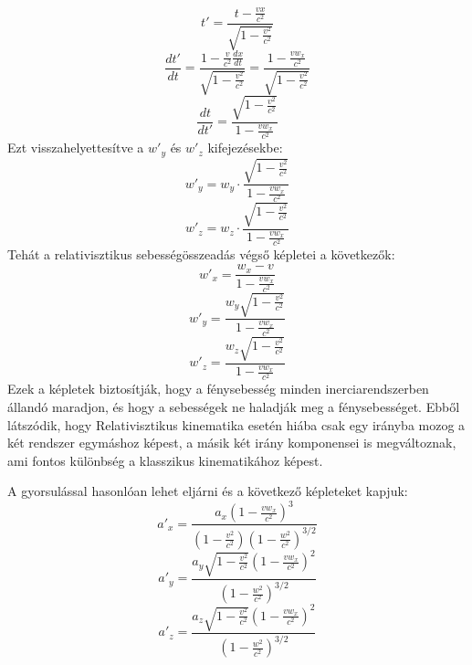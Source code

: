 \documentclass[../main.tex]{subfiles}
\begin{document}
\begin{equation}
    t' = \frac{t - \frac{vx}{c^2}}{\sqrt{1 - \frac{v^2}{c^2}}}
\end{equation}
\begin{equation}
    \frac{dt'}{dt} = \frac{1 - \frac{v}{c^2} \frac{dx}{dt}}{\sqrt{1 - \frac{v^2}{c^2}}} = \frac{1 - \frac{v w_x}{c^2}}{\sqrt{1 - \frac{v^2}{c^2}}}
\end{equation}
\begin{equation}
    \frac{dt}{dt'} = \frac{\sqrt{1 - \frac{v^2}{c^2}}}{1 - \frac{v w_x}{c^2}}
\end{equation}
Ezt visszahelyettesítve a $w'_y$ és $w'_z$ kifejezésekbe:
\begin{equation}
    w'_y = w_y \cdot \frac{\sqrt{1 - \frac{v^2}{c^2}}}{1 - \frac{v w_x}{c^2}}
\end{equation}
\begin{equation}
    w'_z = w_z \cdot \frac{\sqrt{1 - \frac{v^2}{c^2}}}{1 - \frac{v w_x}{c^2}}
\end{equation}
Tehát a relativisztikus sebességösszeadás végső képletei a következők:
\begin{equation}
    w'_x = \frac{w_x - v}{1 - \frac{v w_x}{c^2}}
\end{equation}
\begin{equation}
    w'_y = \frac{w_y \sqrt{1 - \frac{v^2}{c^2}}}{1 - \frac{v w_x}{c^2}}
\end{equation}
\begin{equation}
    w'_z = \frac{w_z \sqrt{1 - \frac{v^2}{c^2}}}{1 - \frac{v w_x}{c^2}}
\end{equation}
Ezek a képletek biztosítják, hogy a fénysebesség minden inerciarendszerben állandó maradjon, és hogy a sebességek ne haladják meg a fénysebességet. Ebből látszódik, hogy
Relativisztikus kinematika esetén hiába csak egy irányba mozog a két rendszer egymáshoz képest, a másik két irány komponensei is megváltoznak, ami fontos különbség a klasszikus kinematikához képest.

A gyorsulással hasonlóan lehet eljárni és a következő képleteket kapjuk:
\begin{equation}
    a'_x = \frac{a_x (1 - \frac{v w_x}{c^2})^3}{(1 - \frac{v^2}{c^2})(1 - \frac{w^2}{c^2})^{3/2}} 
\end{equation}
\begin{equation}
    a'_y = \frac{a_y \sqrt{1 - \frac{v^2}{c^2}} (1 - \frac{v w_x}{c^2})^2}{(1 - \frac{w^2}{c^2})^{3/2}}
\end{equation}
\begin{equation}
    a'_z = \frac{a_z \sqrt{1 - \frac{v^2}{c^2}} (1 - \frac{v w_x}{c^2})^2}{(1 - \frac{w^2}{c^2})^{3/2}}
\end{equation}
\end{document}
